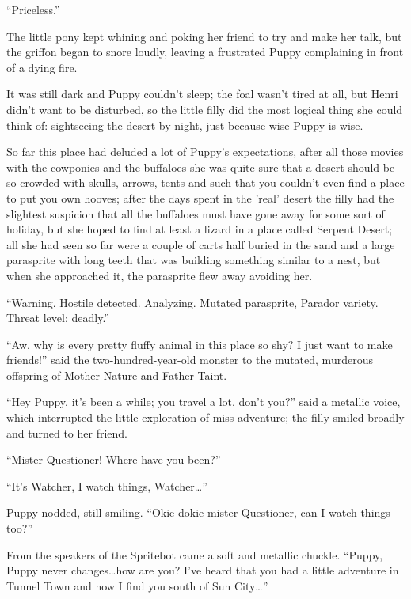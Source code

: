 ``Priceless.''

The little pony kept whining and poking her friend to try and make her talk, but the griffon began to snore loudly, leaving a frustrated Puppy complaining in front of a dying fire.

\horizonline


It was still dark and Puppy couldn't sleep; the foal wasn't tired at all, but Henri didn't want to be disturbed, so the little filly did the most logical thing she could think of: sightseeing the desert by night, just because wise Puppy is wise.

So far this place had deluded a lot of Puppy's expectations, after all those movies with the cowponies and the buffaloes she was quite sure that a desert should be so crowded with skulls, arrows, tents and such that you couldn't even find a place to put you own hooves; after the days spent in the 'real' desert the filly had the slightest suspicion that all the buffaloes must have gone away for some sort of holiday, but she hoped to find at least a lizard in a place called Serpent Desert; all she had seen so far were a couple of carts half buried in the sand and a large parasprite with long teeth that was building something similar to a nest, but when she approached it, the parasprite flew away avoiding her.

``{\mt Warning. Hostile detected. Analyzing. Mutated parasprite, Parador variety. Threat level: deadly.}''

``Aw, why is every pretty fluffy animal in this place so shy? I just want to make friends!'' said the two-hundred-year-old monster to the mutated, murderous offspring of Mother Nature and Father Taint.

``Hey Puppy, it's been a while; you travel a lot, don't you?'' said a metallic voice, which interrupted the little exploration of miss adventure; the filly smiled broadly and turned to her friend.

``Mister Questioner! Where have you been?''

``It's Watcher, I watch things, Watcher\dots''

Puppy nodded, still smiling. ``Okie dokie mister Questioner, can I watch things too?''

From the speakers of the Spritebot came a soft and metallic chuckle. ``Puppy, Puppy never changes\dots how are you? I've heard that you had a little adventure in Tunnel Town and now I find you south of Sun City\dots''

